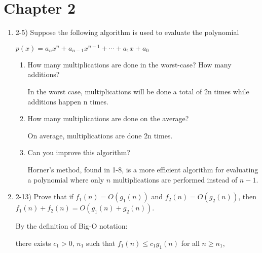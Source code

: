 \documentclass{article}
\begin{document}
\section{Chapter 2}
\begin{enumerate}
    \item 2-5) Suppose the following algorithm is used to evaluate the polynomial
    
    \(p(x)=a_nx^n+a_{n-1}x^{n-1}+\cdots+a_1x+a_0\)
    
    \begin{center}
    \end{center}
    \begin{enumerate}
        \item How many multiplications are done in the worst-case? How many additions?

        In the worst case, multiplications will be done a total of 2n times while additions happen n times.

        \item How many multiplications are done on the average?

        On average, multiplications are done 2n times.
        
        \item Can you improve this algorithm?

        Horner's method, found in 1-8, is a more efficient algorithm for evaluating a polynomial where only $n$ multiplications are performed instead of $n-1$.
        
    \end{enumerate}
    \item 2-13) Prove that if $f_1(n) = O(g_1(n))$ and $f_2(n) = O(g_2(n))$, then $f_1(n) + f_2(n) = O(g_1(n) + g_2(n))$.

    By the definition of Big-O notation:


there exists $c_1 > 0,\, n_1 $ such that $ f_1(n) \leq c_1 g_1(n) $ for all $ n \geq n_1,$



\end{enumerate}
\end{document}

